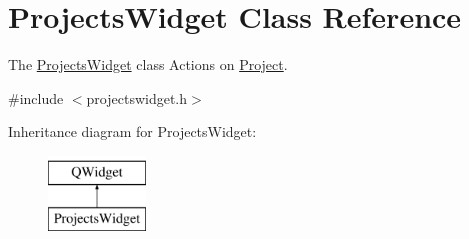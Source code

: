 \hypertarget{classProjectsWidget}{\section{Projects\+Widget Class Reference}
\label{classProjectsWidget}
}


The \hyperlink{classProjectsWidget}{Projects\+Widget} class Actions on \hyperlink{classProject}{Project}.  




{\ttfamily \#include $<$projectswidget.\+h$>$}

Inheritance diagram for Projects\+Widget\+:\begin{figure}[H]
\begin{center}
\leavevmode
\includegraphics[height=2.000000cm]{de/da7/classProjectsWidget}
\end{center}
\end{figure}
